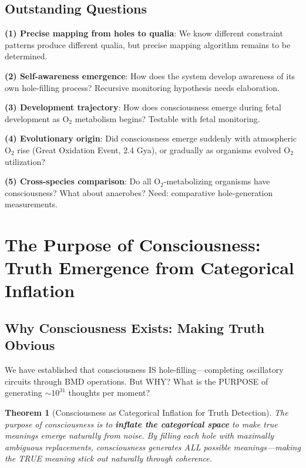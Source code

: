 \documentclass[11pt,a4paper]{article}
\newtheorem{theorem}{Theorem}
\begin{document}
\subsection{Outstanding Questions}

\textbf{(1) Precise mapping from holes to qualia}: We know different constraint patterns produce different qualia, but precise mapping algorithm remains to be determined.

\textbf{(2) Self-awareness emergence}: How does the system develop awareness of its own hole-filling process? Recursive monitoring hypothesis needs elaboration.

\textbf{(3) Development trajectory}: How does consciousness emerge during fetal development as O$_2$ metabolism begins? Testable with fetal monitoring.

\textbf{(4) Evolutionary origin}: Did consciousness emerge suddenly with atmospheric O$_2$ rise (Great Oxidation Event, 2.4 Gya), or gradually as organisms evolved O$_2$ utilization?

\textbf{(5) Cross-species comparison}: Do all O$_2$-metabolizing organisms have consciousness? What about anaerobes? Need: comparative hole-generation measurements.

\section{The Purpose of Consciousness: Truth Emergence from Categorical Inflation}

\subsection{Why Consciousness Exists: Making Truth Obvious}

We have established that consciousness IS hole-filling—completing oscillatory circuits through BMD operations. But WHY? What is the PURPOSE of generating $\sim 10^{31}$ thoughts per moment?

\begin{theorem}[Consciousness as Categorical Inflation for Truth Detection]
\label{thm:consciousness_purpose}
The purpose of consciousness is to \textbf{inflate the categorical space} to make true meanings emerge naturally from noise. By filling each hole with maximally ambiguous replacements, consciousness generates ALL possible meanings—making the TRUE meaning stick out naturally through coherence.
\end{theorem}
\end{document}
